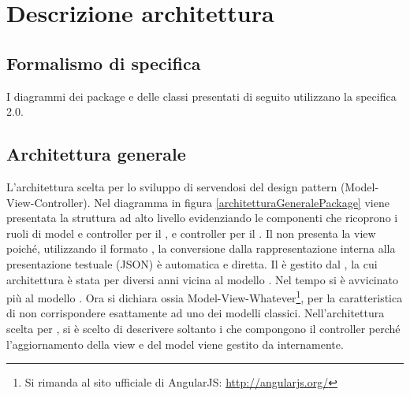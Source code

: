 \section{Descrizione architettura}


\subsection{Formalismo di specifica}

I diagrammi dei package e delle classi presentati di seguito utilizzano la specifica  2.0.

\subsection{Architettura generale}

L'architettura scelta per lo sviluppo di \ProjectName servendosi del design pattern  (Model-View-Controller). Nel diagramma in figura \ref{architetturaGeneralePackage} viene presentata la struttura ad alto livello evidenziando le componenti che ricoprono i ruoli di model e controller per il , e controller per il . Il  non presenta la view poiché, utilizzando il formato , la conversione dalla rappresentazione interna alla presentazione testuale (JSON) è automatica e diretta.
Il  è gestito dal  , la cui architettura è stata per diversi anni vicina al modello . Nel tempo si è avvicinato più al modello . Ora  si dichiara  ossia Model-View-Whatever\footnote{Si rimanda al sito ufficiale di AngularJS: \url{http://angularjs.org/}}, per la caratteristica di non corrispondere esattamente ad uno dei modelli classici. Nell'architettura scelta per \ProjectName, si è scelto di descrivere soltanto i  che compongono il controller perché l'aggiornamento della view e del model viene gestito da  internamente.

